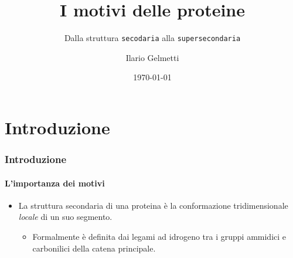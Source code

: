 \documentclass{beamer}
\title{I motivi delle proteine}
\subtitle{Dalla struttura {\tt secodaria} alla {\tt supersecondaria}}
\author{Ilario Gelmetti}
\institute{Università di Pisa}
\date{\today}
\begin{document}
\begin{frame}
  \titlepage
\end{frame}


\section[Sommario]{}
\begin{frame}
\tiny{\tableofcontents}
\end{frame}


\section{Introduzione}
\begin{frame}
  \frametitle{Introduzione}
  \framesubtitle{L'importanza dei motivi}
 
  \begin{itemize}
   \item 	La struttura secondaria di una proteina è la conformazione tridimensionale \emph{locale} di un suo segmento.
  \begin{itemize}
    \item Formalmente è definita dai legami ad idrogeno tra i gruppi ammidici e carbonilici della catena principale.
    \end{itemize}
\end{itemize}


\end{frame}
\end{document}
